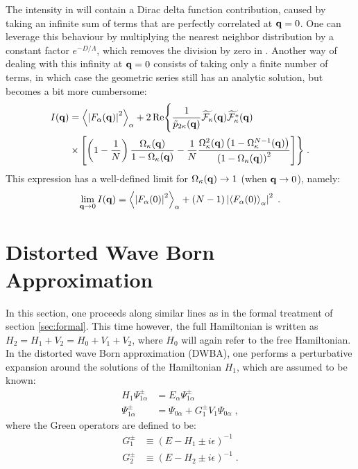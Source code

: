 The intensity in  will contain a Dirac delta function contribution, caused by taking an infinite sum of terms that are perfectly correlated at $\mathbf{q} = 0$. One can leverage this behaviour by multiplying the nearest neighbor distribution by a constant factor $e^{-D/\Lambda}$, which removes the division by zero in .
Another way of dealing with this infinity at $\mathbf{q} =0$ consists of taking only a finite number of terms, in which case the geometric series still has an analytic solution, but becomes a bit more cumbersome:
\begin{equation*}
\begin{split}
  I(\mathbf{q} ) &= \left\langle \left| F_\alpha(\mathbf{q} ) \right| ^2 \right\rangle_{\alpha}  + 2 \operatorname{Re} \Biggl\lbrace \frac{1}{\tilde{p}_{2\kappa}(\mathbf{q} )}\widetilde{\mathcal{F}_\kappa}(\mathbf{q} )\widetilde{\mathcal{F}_\kappa^*}(\mathbf{q} ) \\
  & \times \left[ \left( 1 - \frac{1}{N}\right) \frac{\Omega_\kappa(\mathbf{q} )}{1 - \Omega_\kappa(\mathbf{q} ) } - \frac{1}{N}\frac{\Omega_\kappa^2(\mathbf{q} )\left( 1- \Omega_\kappa^{N-1}(\mathbf{q} )\right) }{\left( 1 - \Omega_\kappa(\mathbf{q} ) \right) ^2 } \right] \Biggr\rbrace \; .
\end{split}
\end{equation*}
This expression has a well-defined limit for $\Omega_\kappa(\mathbf{q} ) \rightarrow 1$ (when $\mathbf{q} \rightarrow 0$), namely:
\begin{equation*}
  \lim_{\mathbf{q} \rightarrow 0} I(\mathbf{q} ) = \left\langle \left| F_\alpha(0 ) \right| ^2 \right\rangle_{\alpha}  + \left( N-1 \right) \left| \left\langle F_\alpha(0 ) \right\rangle_{\alpha}  \right|^2 \; .
\end{equation*}


\section{Distorted Wave Born Approximation} 

In this section, one proceeds along similar lines as in the formal treatment of section \ref{sec:formal}. This time however, the full Hamiltonian is written as $H_2 = H_1 + V_2 = H_0 +V_1 + V_2$, where $H_0$ will again refer to the free Hamiltonian. In the distorted wave Born approximation (DWBA), one performs a perturbative expansion around the solutions of the Hamiltonian $H_1$, which are assumed to be known:
\begin{align*}
  H_1\Psi^\pm_{1\alpha} &= E_\alpha\Psi^\pm_{1\alpha} \\
  \Psi^\pm_{1\alpha} &= \Psi_{0\alpha} + G^\pm_1 V_1 \Psi_{0\alpha} \; ,
\end{align*}
where the Green operators are defined to be:
\begin{align*}
  G^\pm_1 &\equiv (E-H_1\pm i\epsilon) ^{-1} \nonumber \\
  G^\pm_2 &\equiv (E-H_2\pm i\epsilon) ^{-1} \; .
\end{align*}

